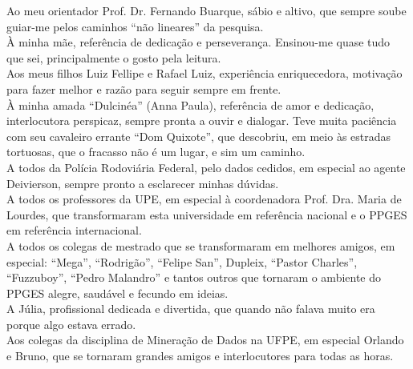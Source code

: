 Ao meu orientador Prof. Dr. Fernando Buarque, sábio e altivo, que sempre soube guiar-me pelos caminhos ``não lineares''  da pesquisa.\\

À minha mãe, referência de dedicação e perseverança. Ensinou-me quase tudo que sei, principalmente o gosto pela leitura.\\

Aos meus filhos Luiz Fellipe e Rafael Luiz, experiência enriquecedora, motivação para fazer melhor e razão para seguir sempre em frente.\\

À minha amada ``Dulcinéa'' (Anna Paula), referência de amor e dedicação, interlocutora perspicaz, sempre pronta a ouvir e dialogar. Teve muita paciência com seu cavaleiro errante ``Dom Quixote'', que descobriu, em meio às estradas tortuosas, que o fracasso não é um lugar, e sim um caminho.\\

A todos da Polícia Rodoviária Federal, pelo dados cedidos, em especial ao agente Deivierson,  sempre pronto a esclarecer minhas dúvidas.\\

A todos os professores da UPE, em especial à coordenadora Prof. Dra. Maria de Lourdes, que transformaram esta universidade em referência nacional e o PPGES em referência internacional.\\

A todos os colegas de mestrado que se transformaram em melhores amigos, em especial: ``Mega'', ``Rodrigão'', ``Felipe San'', Dupleix, ``Pastor Charles'', ``Fuzzuboy'', ``Pedro Malandro'' e tantos outros que tornaram o ambiente do PPGES alegre, saudável e fecundo em ideias.\\

A Júlia, profissional dedicada e divertida, que quando não falava muito era porque algo estava errado.\\

Aos colegas da disciplina de Mineração de Dados na UFPE, em especial Orlando e Bruno, que se tornaram grandes amigos e interlocutores para todas as horas.

